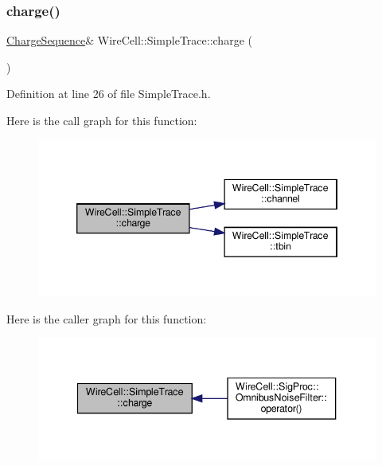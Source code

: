 \subsubsection{\texorpdfstring{charge()}{charge()}\hspace{0.1cm}{\footnotesize\ttfamily [1/2]}}
{\footnotesize\ttfamily \hyperlink{class_wire_cell_1_1_i_trace_a3dab103257bc46bfd486966f69836954}{Charge\+Sequence}\& Wire\+Cell\+::\+Simple\+Trace\+::charge (\begin{DoxyParamCaption}{ }\end{DoxyParamCaption})\hspace{0.3cm}{\ttfamily [inline]}}



Definition at line 26 of file Simple\+Trace.\+h.

Here is the call graph for this function\+:
\nopagebreak
\begin{figure}[H]
\begin{center}
\leavevmode
\includegraphics[width=346pt]{class_wire_cell_1_1_simple_trace_a2f7bafeb7ae30fa16c72d3c8ae0b64a6_cgraph}
\end{center}
\end{figure}
Here is the caller graph for this function\+:
\nopagebreak
\begin{figure}[H]
\begin{center}
\leavevmode
\includegraphics[width=340pt]{class_wire_cell_1_1_simple_trace_a2f7bafeb7ae30fa16c72d3c8ae0b64a6_icgraph}
\end{center}
\end{figure}
\mbox{\label{class_wire_cell_1_1_simple_trace_a961cf4538022571bfcc24895c2c45cb4}} 
